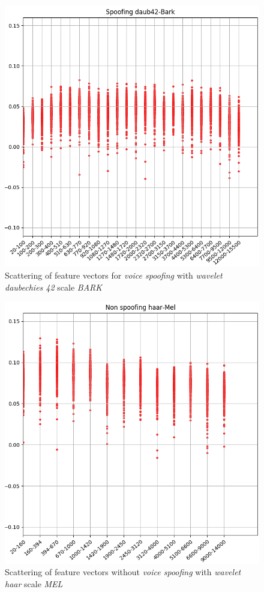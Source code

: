 		\begin{figure}[H]
			\centering
			\includegraphics[scale=.55]{images/results/barkVersusMel/spoofingDaub42Bark}
			\caption{Scattering of feature vectors for \textit{voice spoofing} with \textit{wavelet daubechies 42} scale \textit{BARK}}
			\label{fig:spoofingdaub42bark}
		\end{figure}
		
		\begin{figure}[H]
			\centering
			\includegraphics[scale=.55]{images/results/barkVersusMel/liveHaarMel}
			\caption{Scattering of feature vectors without \textit{voice spoofing} with \textit{wavelet haar} scale \textit{MEL}}
			\label{fig:livehaarmel}
		\end{figure}
		
